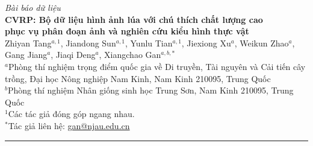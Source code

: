 \documentclass[12pt, a4paper]{article}
\begin{document}
\begin{center}
  {\small \textit{Bài báo dữ liệu}}\\[6pt]
  {\LARGE \textbf{CVRP: Bộ dữ liệu hình ảnh lúa với chú thích chất lượng cao\\
  phục vụ phân đoạn ảnh và nghiên cứu kiểu hình thực vật}}\\[10pt]
  {\normalsize
    Zhiyan Tang$^{a,1}$, Jiandong Sun$^{a,1}$, Yunlu Tian$^{a,1}$,
    Jiexiong Xu$^{a}$, Weikun Zhao$^{a}$, Gang Jiang$^{a}$,
    Jiaqi Deng$^{a}$, Xiangchao Gan$^{a,b,*}$
  }\\[6pt]
  {\small
    $^{a}$Phòng thí nghiệm trọng điểm quốc gia về Di truyền, Tài nguyên và Cải tiến cây trồng,
    Đại học Nông nghiệp Nam Kinh, Nam Kinh 210095, Trung Quốc\\
    $^{b}$Phòng thí nghiệm Nhân giống sinh học Trung Sơn, Nam Kinh 210095, Trung Quốc\\[4pt]
    $^{1}$Các tác giả đóng góp ngang nhau.\\
    $^{*}$Tác giả liên hệ: \href{mailto:gan@njau.edu.cn}{gan@njau.edu.cn}
  }
\end{center}

\vspace{0.5cm}
\noindent\rule{\linewidth}{0.4pt}
\end{document}
